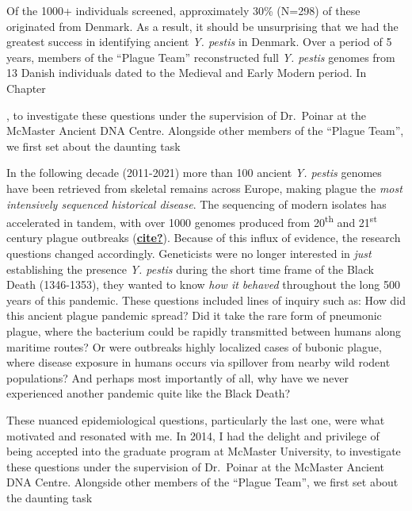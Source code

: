 \documentclass[
]{report}
\begin{document}
Of the 1000+ individuals screened, approximately 30\% (N=298) of these
originated from Denmark. As a result, it should be unsurprising that we
had the greatest success in identifying ancient \emph{Y. pestis} in
Denmark. Over a period of 5 years, members of the ``Plague Team''
reconstructed full \emph{Y. pestis} genomes from 13 Danish individuals
dated to the Medieval and Early Modern period. In Chapter


, to investigate these questions under the supervision of Dr.~Poinar at
the McMaster Ancient DNA Centre. Alongside other members of the ``Plague
Team'', we first set about the daunting task

In the following decade (2011-2021) more than 100 ancient \emph{Y.
pestis} genomes have been retrieved from skeletal remains across Europe,
making plague the \emph{most intensively sequenced historical disease}.
The sequencing of modern isolates has accelerated in tandem, with over
1000 genomes produced from 20\textsuperscript{th} and
21\textsuperscript{st} century plague outbreaks
(\protect\hyperlink{ref-cite}{\textbf{cite?}}). Because of this influx
of evidence, the research questions changed accordingly. Geneticists
were no longer interested in \emph{just} establishing the presence
\emph{Y. pestis} during the short time frame of the Black Death
(1346-1353), they wanted to know \emph{how it behaved} throughout the
long 500 years of this pandemic. These questions included lines of
inquiry such as: How did this ancient plague pandemic spread? Did it
take the rare form of pneumonic plague, where the bacterium could be
rapidly transmitted between humans along maritime routes? Or were
outbreaks highly localized cases of bubonic plague, where disease
exposure in humans occurs via spillover from nearby wild rodent
populations? And perhaps most importantly of all, why have we never
experienced another pandemic quite like the Black Death?

These nuanced epidemiological questions, particularly the last one, were
what motivated and resonated with me. In 2014, I had the delight and
privilege of being accepted into the graduate program at McMaster
University, to investigate these questions under the supervision of
Dr.~Poinar at the McMaster Ancient DNA Centre. Alongside other members
of the ``Plague Team'', we first set about the daunting task
\end{document}
